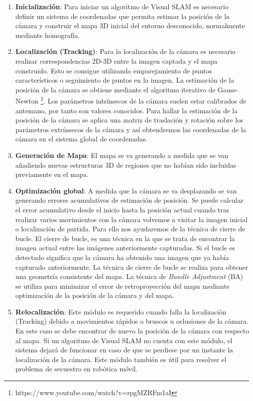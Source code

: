 \begin {enumerate}
\item \textbf{Inicialización}:  Para iniciar un algoritmo de Visual SLAM es necesario definir un sistema de coordenadas que permita estimar la posición de la cámara y construir el mapa 3D inicial del entorno desconocido, normalmente mediante homografía.
\item \textbf{Localización (Tracking)}: Para la localización de la cámara es necesario realizar correspondencias 2D-3D entre la imagen captada y el mapa construido. Esto se consigue utilizando emparejamiento de puntos característicos o seguimiento de puntos en la imagen. La estimación de la  posición de la cámara se obtiene mediante el algoritmo iterativo de Gauss-Newton \footnote{https://www.youtube.com/watch?v=rpgMZRFm1aI}.
Los parámetros intrínsecos de la cámara suelen estar calibrados de antemano, por tanto son valores conocidos. Para hallar la estimación de la posición de la cámara se aplica una matriz de traslación y rotación sobre los parámetros extrínsecos de la cámara y así obtendremos las coordenadas de la cámara en el sistema global de coordenadas.
\item \textbf{Generación de Mapa}: El mapa se va generando a medida que se van añadiendo nuevas estructuras 3D de regiones que no habían sido incluidas previamente en el mapa.
\item \textbf{Optimización global}:  A medida que la cámara se va desplazando se van generando errores acumulativos de estimación de posición. Se puede calcular el error acumulativo desde el inicio hasta la posición actual cuando tras realizar varios movimientos con la cámara volvemos a visitar la imagen inicial o localización de partida. Para ello nos ayudaremos de la técnica de cierre de bucle. El cierre de bucle, es una técnica en la que se trata de encontrar la imagen actual entre las imágenes anteriormente capturadas. Si el bucle es detectado significa que la cámara ha obtenido una imagen que ya había capturado anteriormente. La técnica de cierre de bucle se realiza para obtener una geometría consistente del mapa. La técnica de \textit{Bundle Adjustment} (BA) se utiliza para minimizar el error de retroproyección del mapa mediante optimización de la posición de la cámara y del mapa.

\item \textbf{Relocalización}: Este módulo es requerido cuando falla la localización (Tracking) debido a movimientos rápidos o bruscos u oclusiones de la cámara. En este caso se debe encontrar de nuevo la posición de la cámara con respecto al mapa. Si un algoritmo de Visual SLAM no cuenta con este módulo, el sistema dejará de funcionar en caso de que se perdiese por un instante la localización de la cámara. Este módulo también es útil para resolver el problema de secuestro en robótica móvil.

\end {enumerate}



